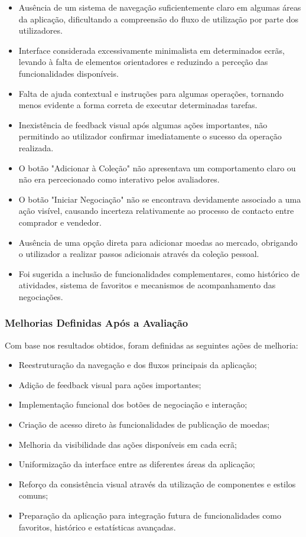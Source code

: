 \documentclass[12pt,a4paper]{article}
\begin{document}
\begin{itemize}
\setlength{\itemsep}{0.15em}
\item Ausência de um sistema de navegação suficientemente claro em algumas áreas da aplicação, dificultando a compreensão do fluxo de utilização por parte dos utilizadores.
\item Interface considerada excessivamente minimalista em determinados ecrãs, levando à falta de elementos orientadores e reduzindo a perceção das funcionalidades disponíveis.
\item Falta de ajuda contextual e instruções para algumas operações, tornando menos evidente a forma correta de executar determinadas tarefas.
\item Inexistência de feedback visual após algumas ações importantes, não permitindo ao utilizador confirmar imediatamente o sucesso da operação realizada.
\item O botão "Adicionar à Coleção" não apresentava um comportamento claro ou não era percecionado como interativo pelos avaliadores.
\item O botão "Iniciar Negociação" não se encontrava devidamente associado a uma ação visível, causando incerteza relativamente ao processo de contacto entre comprador e vendedor.
\item Ausência de uma opção direta para adicionar moedas ao mercado, obrigando o utilizador a realizar passos adicionais através da coleção pessoal.
\item Foi sugerida a inclusão de funcionalidades complementares, como histórico de atividades, sistema de favoritos e mecanismos de acompanhamento das negociações.
\end{itemize}

\subsubsection{Melhorias Definidas Após a Avaliação}

Com base nos resultados obtidos, foram definidas as seguintes ações de melhoria:

\begin{itemize}
\setlength{\itemsep}{0.15em}
\item Reestruturação da navegação e dos fluxos principais da aplicação;
\item Adição de feedback visual para ações importantes;
\item Implementação funcional dos botões de negociação e interação;
\item Criação de acesso direto às funcionalidades de publicação de moedas;
\item Melhoria da visibilidade das ações disponíveis em cada ecrã;
\item Uniformização da interface entre as diferentes áreas da aplicação;
\item Reforço da consistência visual através da utilização de componentes e estilos comuns;
\item Preparação da aplicação para integração futura de funcionalidades como favoritos, histórico e estatísticas avançadas.
\end{itemize}
\end{document}
